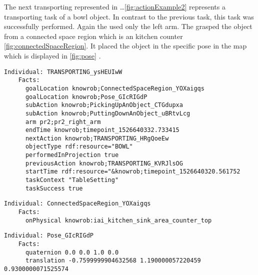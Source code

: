 	The next transporting represented in \dots \ref{fig:actionExample2} represents a transporting task of a bowl object.
	In contrast to the previous task, this task was successfully performed.
	Again the \pr used only the left arm.
	The \pr grasped the object from a connected space region which is an kitchen counter \ref{fig:connectedSpaceRegion}.
	It placed the object in the specific pose in the map which is displayed in \ref{fig:pose} .
	

\begin{minipage}{\textwidth}
\scriptsize
\begin{lstlisting}[frame=single]
  Individual: TRANSPORTING_ysHEUIwW
	Facts: 
	  goalLocation knowrob;ConnectedSpaceRegion_YOXaigqs
	  goalLocation knowrob;Pose_GIcRIGdP
	  subAction knowrob;PickingUpAnObject_CTGdupxa
      subAction knowrob;PuttingDownAnObject_uBRtvLcg
      arm pr2;pr2_right_arm
      endTime knowrob;timepoint_1526640332.733415
      nextAction knowrob;TRANSPORTING_HRgQoeEw
      objectType rdf:resource="BOWL"
      performedInProjection true
      previousAction knowrob;TRANSPORTING_KVRJlsOG
      startTime rdf:resource="&knowrob;timepoint_1526640320.561752
	  taskContext "TableSetting"
	  taskSuccess true
\end{lstlisting}
\vspace{2mm}
\label{fig:actionExample2}
\end{minipage}


\begin{minipage}{\textwidth}
	\scriptsize
\begin{lstlisting}[frame=single]
  Individual: ConnectedSpaceRegion_YOXaigqs
	Facts: 
	  onPhysical knowrob:iai_kitchen_sink_area_counter_top
\end{lstlisting}
	\vspace{2mm}
	\label{fig:connectedSpaceRegion}
\end{minipage}


\begin{minipage}{\textwidth}
	\scriptsize
\begin{lstlisting}[frame=single]
  Individual: Pose_GIcRIGdP
    Facts: 
	  quaternion 0.0 0.0 1.0 0.0
	  translation -0.7599999904632568 1.190000057220459 0.9300000071525574
\end{lstlisting}
	\vspace{2mm}
	\label{fig:pose}
\end{minipage}
